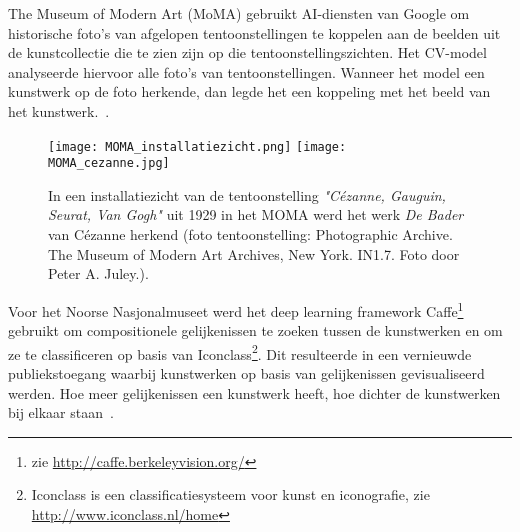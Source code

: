 The Museum of Modern Art (MoMA) gebruikt AI-diensten van Google om historische foto’s van afgelopen tentoonstellingen te koppelen aan de beelden uit de kunstcollectie die te zien zijn op die tentoonstellingszichten. Het CV-model analyseerde hiervoor alle foto’s van tentoonstellingen. Wanneer het model een kunstwerk op de foto herkende, dan legde het een koppeling met het beeld van het kunstwerk.~\autocite{MOMA2018?}. 

\begin{figure}
	\centering
	\texttt{[image: MOMA\_installatiezicht.png]}\hfill
	\texttt{[image: MOMA\_cezanne.jpg]}\hfill
	\caption[Installatiezicht van MOMA waarin de AI-diensten van Google Arts \& Culture een schilderij van Cézanne herkennen]{In een installatiezicht van de tentoonstelling \textit{"Cézanne, Gauguin, Seurat, Van Gogh"} uit 1929 in het MOMA werd het werk \textit{De Bader} van Cézanne herkend (foto tentoonstelling: Photographic Archive. The Museum of Modern Art Archives, New York. IN1.7. Foto door Peter A. Juley.).}
\end{figure}

Voor het Noorse Nasjonalmuseet werd het deep learning framework Caffe\footnote{zie \url{http://caffe.berkeleyvision.org/}} gebruikt om compositionele gelijkenissen te zoeken tussen de kunstwerken en om ze te classificeren op basis van Iconclass\footnote{Iconclass is een classificatiesysteem voor kunst en iconografie, zie \url{http://www.iconclass.nl/home}}. Dit resulteerde in een vernieuwde publiekstoegang waarbij kunstwerken op basis van gelijkenissen gevisualiseerd werden. Hoe meer gelijkenissen een kunstwerk heeft, hoe dichter de kunstwerken bij elkaar staan~\autocite{Nasjonalmuseet2017?}.

